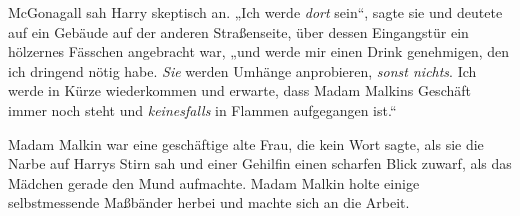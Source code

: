 McGonagall sah Harry skeptisch an. „Ich werde \emph{dort} sein“, sagte sie und deutete auf ein Gebäude auf der anderen Straßenseite, über dessen Eingangstür ein hölzernes Fässchen angebracht war, „und werde mir einen Drink genehmigen, den ich dringend nötig habe. \emph{Sie} werden Umhänge anprobieren, \emph{sonst nichts}. Ich werde in Kürze wiederkommen und erwarte, dass Madam Malkins Geschäft immer noch steht und \emph{keinesfalls} in Flammen aufgegangen ist.“

Madam Malkin war eine geschäftige alte Frau, die kein Wort sagte, als sie die Narbe auf Harrys Stirn sah und einer Gehilfin einen scharfen Blick zuwarf, als das Mädchen gerade den Mund aufmachte. Madam Malkin holte einige selbstmessende Maßbänder herbei und machte sich an die Arbeit.

